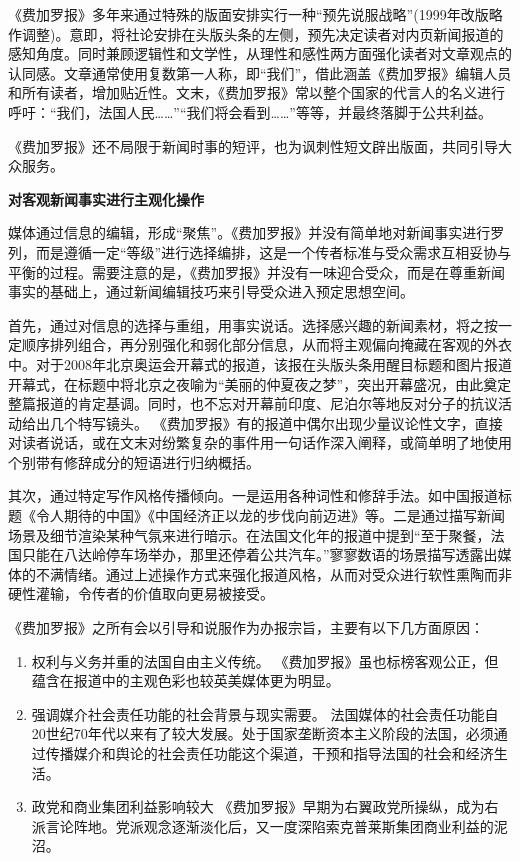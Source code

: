 \documentclass[a4paper,openany]{book}
\begin{document}
《费加罗报》多年来通过特殊的版面安排实行一种“预先说服战略”(1999年改版略作调整)。意即，将社论安排在头版头条的左侧，预先决定读者对内页新闻报道的感知角度。同时兼顾逻辑性和文学性，从理性和感性两方面强化读者对文章观点的认同感。文章通常使用复数第一人称，即“我们”，借此涵盖《费加罗报》编辑人员和所有读者，增加贴近性。文末，《费加罗报》常以整个国家的代言人的名义进行呼吁：“我们，法国人民……”“我们将会看到……”等等，并最终落脚于公共利益。

《费加罗报》还不局限于新闻时事的短评，也为讽刺性短文辟出版面，共同引导大众服务。

\textbf{对客观新闻事实进行主观化操作}

媒体通过信息的编辑，形成“聚焦”。《费加罗报》并没有简单地对新闻事实进行罗列，而是遵循一定“等级”进行选择编排，这是一个传者标准与受众需求互相妥协与平衡的过程。需要注意的是，《费加罗报》并没有一味迎合受众，而是在尊重新闻事实的基础上，通过新闻编辑技巧来引导受众进入预定思想空间。

首先，通过对信息的选择与重组，用事实说话。选择感兴趣的新闻素材，将之按一定顺序排列组合，再分别强化和弱化部分信息，从而将主观偏向掩藏在客观的外衣中。对于2008年北京奥运会开幕式的报道，该报在头版头条用醒目标题和图片报道开幕式，在标题中将北京之夜喻为“美丽的仲夏夜之梦”，突出开幕盛况，由此奠定整篇报道的肯定基调。同时，也不忘对开幕前印度、尼泊尔等地反对分子的抗议活动给出几个特写镜头。
《费加罗报》有的报道中偶尔出现少量议论性文字，直接对读者说话，或在文末对纷繁复杂的事件用一句话作深入阐释，或简单明了地使用个别带有修辞成分的短语进行归纳概括。

其次，通过特定写作风格传播倾向。一是运用各种词性和修辞手法。如中国报道标题《令人期待的中国》《中国经济正以龙的步伐向前迈进》等。二是通过描写新闻场景及细节渲染某种气氛来进行暗示。在法国文化年的报道中提到“至于聚餐，法国只能在八达岭停车场举办，那里还停着公共汽车。”寥寥数语的场景描写透露出媒体的不满情绪。通过上述操作方式来强化报道风格，从而对受众进行软性熏陶而非硬性灌输，令传者的价值取向更易被接受。

《费加罗报》之所有会以引导和说服作为办报宗旨，主要有以下几方面原因：

\begin{enumerate}

\item 权利与义务并重的法国自由主义传统。
《费加罗报》虽也标榜客观公正，但蕴含在报道中的主观色彩也较英美媒体更为明显。
\item 强调媒介社会责任功能的社会背景与现实需要。
法国媒体的社会责任功能自20世纪70年代以来有了较大发展。处于国家垄断资本主义阶段的法国，必须通过传播媒介和舆论的社会责任功能这个渠道，干预和指导法国的社会和经济生活。
\item 政党和商业集团利益影响较大
《费加罗报》早期为右翼政党所操纵，成为右派言论阵地。党派观念逐渐淡化后，又一度深陷索克普莱斯集团商业利益的泥沼。

\end{enumerate}
\end{document}
